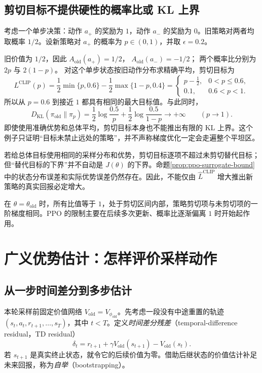 \documentclass[UTF8,12pt,a4paper,fontset=fandol]{ctexart}
\begin{document}
\subsection{剪切目标不提供硬性的概率比或 KL 上界}

\begin{example}
\label{ex:ppo-bandit}
考虑一个单步决策：动作 $a_+$ 的奖励为 $1$，动作 $a_-$ 的奖励为 $0$。旧策略对两者均取概率 $1/2$。设新策略对 $a_+$ 的概率为 $p\in(0,1)$，并取 $\epsilon=0.2$。
\end{example}
\begin{solve}
旧价值为 $1/2$，因此
$A_{\mathrm{old}}(a_+)=1/2$，
$A_{\mathrm{old}}(a_-)=-1/2$；
两个概率比分别为 $2p$ 与 $2(1-p)$。
对这个单步状态按旧动作分布求精确平均，剪切目标为
\[
  L^{\mathrm{CLIP}}(p)
  =\frac12\min\{p,0.6\}
   -\frac12\max\{1-p,0.4\}
  =
  \begin{cases}
    p-\tfrac12,&0<p\le0.6,\\
    0.1,&0.6<p<1.
  \end{cases}
\]
所以从 $p=0.6$ 到接近 $1$ 都具有相同的最大目标值。与此同时，
\[
  D_{\mathrm{KL}}(\pi_{\mathrm{old}}\|\pi_p)
  =\frac12\log\frac{0.5}{p}
   +\frac12\log\frac{0.5}{1-p}
  \longrightarrow+\infty
  \qquad(p\to1).
\]
即使使用准确优势和总体平均，剪切目标本身也不能推出有限的 KL 上界。这个例子只证明“目标未禁止远处的策略”，并不声称梯度优化一定会走遍整个平坦区。
\end{solve}

若给总体目标使用相同的采样分布和优势，剪切目标逐项不超过未剪切替代目标；但“替代目标的下界”并不自动是 $J(\theta)$ 的下界。命题\ref{prop:ppo-surrogate-bound}中的状态分布误差和实际优势误差仍然存在。因此，不能仅由 $\widehat L^{\mathrm{CLIP}}$ 增大推出新策略的真实回报必定增大。

在 $\theta=\theta_{\mathrm{old}}$ 时，所有比值等于 $1$，处于剪切区间内部，策略剪切项与未剪切项的一阶梯度相同。PPO 的限制主要在后续多次更新、概率比逐渐偏离 $1$ 时开始起作用。

\section{广义优势估计：怎样评价采样动作}
\label{sec:ppo-gae}

\subsection{从一步时间差分到多步估计}

本轮采样前固定价值网络
$V_{\mathrm{old}}=V_{\phi_{\mathrm{old}}}$。先考虑一段没有中途重置的轨迹
$(s_t,a_t,r_{t+1},\ldots,s_T)$，其中 $t<T$。定义\emph{时间差分残差}（temporal-difference residual，TD residual）
\begin{equation}
  \delta_t=r_{t+1}+\gamma V_{\mathrm{old}}(s_{t+1})
           -V_{\mathrm{old}}(s_t).
  \label{eq:ppo-td}
\end{equation}
若 $s_{t+1}$ 是真实终止状态，就令它的后续价值为零。借助后继状态的价值估计补足未来回报，称为\emph{自举}（bootstrapping）。
\end{document}
